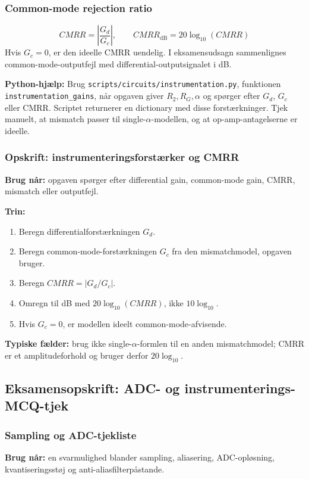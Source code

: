 \subsubsection{Common-mode rejection ratio}
\[
CMRR=\left|\frac{G_d}{G_c}\right|,\qquad
CMRR_{\mathrm{dB}}=20\log_{10}(CMRR)
\]
Hvis \(G_c=0\), er den ideelle CMRR uendelig. I eksamensudsagn sammenlignes common-mode-outputfejl med differential-outputsignalet i dB.

\textbf{Python-hjælp:} Brug \texttt{scripts/circuits/instrumentation.py}, funktionen \texttt{instrumentation\_gains}, når opgaven giver \(R_2,R_G,\alpha\) og spørger efter \(G_d\), \(G_c\) eller CMRR. Scriptet returnerer en dictionary med disse forstærkninger. Tjek manuelt, at mismatch passer til single-\(\alpha\)-modellen, og at op-amp-antagelserne er ideelle.

\subsubsection{Opskrift: instrumenteringsforstærker og CMRR}
\textbf{Brug når:} opgaven spørger efter differential gain, common-mode gain, CMRR, mismatch eller outputfejl.

\textbf{Trin:}
\begin{enumerate}
    \item Beregn differentialforstærkningen \(G_d\).
    \item Beregn common-mode-forstærkningen \(G_c\) fra den mismatchmodel, opgaven bruger.
    \item Beregn \(CMRR=|G_d/G_c|\).
    \item Omregn til dB med \(20\log_{10}(CMRR)\), ikke \(10\log_{10}\).
    \item Hvis \(G_c=0\), er modellen ideelt common-mode-afvisende.
\end{enumerate}

\textbf{Typiske fælder:} brug ikke single-\(\alpha\)-formlen til en anden mismatchmodel; CMRR er et amplitudeforhold og bruger derfor \(20\log_{10}\).

\subsection{Eksamensopskrift: ADC- og instrumenterings-MCQ-tjek}

\subsubsection{Sampling og ADC-tjekliste}
\textbf{Brug når:} en svarmulighed blander sampling, aliasering, ADC-opløsning, kvantiseringsstøj og anti-aliasfilterpåstande.


